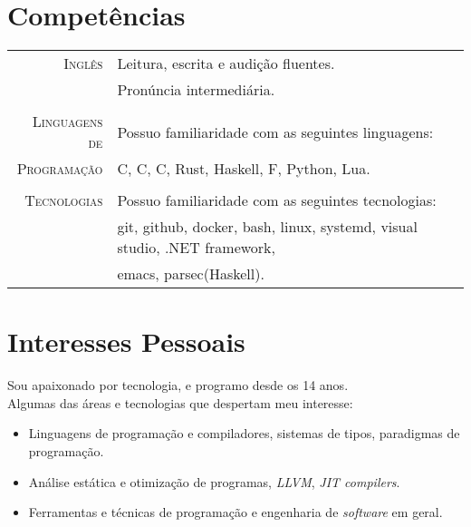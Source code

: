\documentclass[a4paper,10pt]{article}
\newcommand{\cpp}{C\protect\scalebox{0.8}{\protect\raisebox{0.4ex}{++}}}
\renewcommand\#{\protect\scalebox{0.8}{\protect\raisebox{0.4ex}{\char"0023}}}
\begin{document}
\section{Competências}
\begin{tabular}{r|l}
  \textsc{Inglês} & Leitura, escrita e audição fluentes. \\
  & Pronúncia intermediária. \\
  
  \multicolumn{2}{c}{} \\
  \textsc{Linguagens de} & Possuo familiaridade com as seguintes linguagens: \\
  \textsc{Programação}& C, \cpp, C\#, Rust, Haskell, F\#, Python, Lua. \\
  
  \multicolumn{2}{c}{} \\
  \textsc{Tecnologias} & Possuo familiaridade com as seguintes tecnologias: \\
  & git, github, docker, bash, linux, systemd, visual studio, .NET framework, \\
  & emacs, parsec(Haskell).
\end{tabular}


\section{Interesses Pessoais}
Sou apaixonado por tecnologia, e programo desde os 14 anos. \\
Algumas das áreas e tecnologias que despertam meu interesse:
\vspace{-3pt}
\begin{itemize}
  \setlength\itemsep{-3pt}
  \item Linguagens de programação e compiladores, sistemas de tipos, paradigmas de programação.
  \item Análise estática e otimização de programas, \emph{LLVM}, \emph{JIT compilers}.
  \item Ferramentas e técnicas de programação e engenharia de \emph{software} em geral.
\end{itemize}
\end{document}
